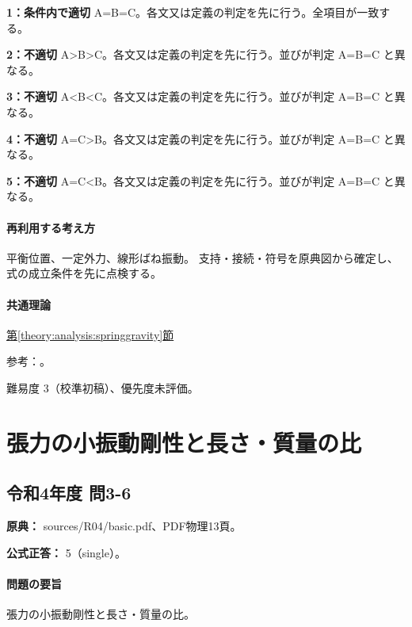 \noindent\textbf{1：条件内で適切} A=\allowbreak{}B=\allowbreak{}C。各文又は定義の判定を先に行う。全項目が一致する。\par

\noindent\textbf{2：不適切} A>B>C。各文又は定義の判定を先に行う。並びが判定 A=\allowbreak{}B=\allowbreak{}C と異なる。\par

\noindent\textbf{3：不適切} A<B<C。各文又は定義の判定を先に行う。並びが判定 A=\allowbreak{}B=\allowbreak{}C と異なる。\par

\noindent\textbf{4：不適切} A=\allowbreak{}C>B。各文又は定義の判定を先に行う。並びが判定 A=\allowbreak{}B=\allowbreak{}C と異なる。\par

\noindent\textbf{5：不適切} A=\allowbreak{}C<B。各文又は定義の判定を先に行う。並びが判定 A=\allowbreak{}B=\allowbreak{}C と異なる。\par

\paragraph{再利用する考え方} 平衡位置、一定外力、線形ばね振動。 支持・接続・符号を原典図から確定し、式の成立条件を先に点検する。

\paragraph{共通理論} \hyperref[theory:analysis:springgravity]{第\ref*{theory:analysis:springgravity}節}

\par 参考：\cite{analysis57_shm}。

\par 難易度 3（校準初稿）、優先度未評価。

\section{張力の小振動剛性と長さ・質量の比}

\subsection{令和4年度 問3-6}
\label{q:r04-reg-basic-3-6}

\noindent\textbf{原典：} sources/R04/basic.pdf、PDF物理13頁。

\textbf{公式正答：} 5（single）。

\paragraph{問題の要旨} 張力の小振動剛性と長さ・質量の比。

